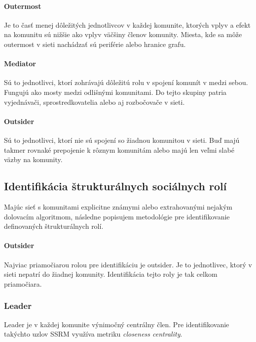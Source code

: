 \documentclass[slovak,master,public,dept460,male,cpdeclaration,oneside]{diploma}
\begin{document}
\paragraph{Outermost}
\hfill \break
Je to časť menej dôležitých jednotlivcov v každej komunite, ktorých vplyv a efekt na komunitu sú nižšie ako vplyv väčšiny členov komunity. Miesta, kde sa môže outermost v sieti nachádzať sú periférie alebo hranice grafu.

\paragraph{Mediator}
\hfill \break
Sú to jednotlivci, ktorí zohrávajú dôležitú rolu v spojení komunít v medzi sebou. Fungujú ako mosty medzi odlišnými komunitami. Do tejto skupiny patria vyjednávači, sprostredkovatelia alebo aj rozbočovače v sieti. 

\paragraph{Outsider}
\hfill \break
Sú to jednotlivci, ktorí nie sú spojení so žiadnou komunitou v sieti. Buď majú takmer rovnaké prepojenie k rôznym komunitám alebo majú len veľmi slabé väzby na komunity.



\subsection{Identifikácia štrukturálnych sociálnych rolí} \label{identifikacia}
Majúc sieť s komunitami explicitne známymi alebo extrahovanými nejakým dolovacím algoritmom, následne popisujem metodológie pre identifikovanie definovaných štrukturálnych rolí.

\paragraph{Outsider}
\hfill \break
Najviac priamočiarou rolou pre identifikáciu je outsider. Je to jednotlivec, ktorý v sieti nepatrí do žiadnej komunity. Identifikácia tejto roly je tak celkom priamočiara.


\subsubsection{Leader}

Leader je v každej komunite výnimočný centrálny člen. Pre identifikovanie takýchto uzlov SSRM využíva metriku \textit{closeness centrality}.
\end{document}

